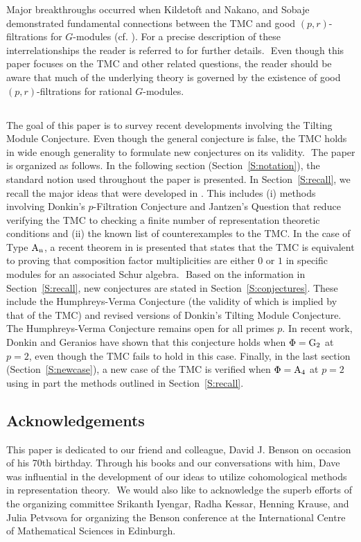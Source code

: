 \documentclass[twoside,11pt,reqno]{amsart}
\newcommand{\0}{\bar 0}
\newcommand{\1}{\bar 1}
\theoremstyle{definition}
\numberwithin{equation}{subsection}
\begin{document}
Major breakthroughs occurred when 
Kildetoft and Nakano, and Sobaje demonstrated fundamental connections between the TMC and good $(p,r)$-filtrations for $G$-modules (cf. \cite{KN15, So18}). 
For a precise description of these interrelationships the reader is referred to \cite[Section 2.2]{BNPS24} for further details.
﻿
Even though this paper focuses on the TMC and other related questions, the reader should be aware that much of the underlying theory is governed by the existence of good $(p,r)$-filtrations for rational $G$-modules. 
﻿
\subsection{} The goal of this paper is to survey recent developments involving the Tilting Module Conjecture. Even though the general conjecture is false, the TMC holds in wide enough generality to formulate new conjectures on its validity. 
﻿
The paper is organized as follows. In the following section (Section~\ref{S:notation}), the standard notion used throughout the paper is presented. In Section~\ref{S:recall}, we recall the major ideas that were developed in 
\cite{BNPS19, BNPS20, BNPS22a, BNPS22b, BNPS24,BNPS26}. This includes (i) methods involving Donkin's $p$-Filtration Conjecture and Jantzen's Question that reduce verifying the TMC to checking a finite number of representation theoretic 
conditions and (ii) the known list of counterexamples to the TMC. In the case of Type $\rm{A}_{n}$, a recent theorem in \cite{BNPS26} is presented that states that  the TMC is equivalent to proving that composition factor multiplicities are either 
$0$ or $1$ in specific modules for an associated Schur algebra. 
﻿
Based on the information in Section~\ref{S:recall}, new conjectures are stated in Section~\ref{S:conjectures}. These include the Humphreys-Verma Conjecture (the validity of which is implied by that of the TMC) and revised versions of Donkin's Tilting Module Conjecture. 
The Humphreys-Verma Conjecture remains open for all primes $p$. In recent work, Donkin and Geranios \cite{DG26} have shown that this conjecture holds when $\Phi=\rm{G}_{2}$ at $p=2$, even though the TMC fails 
to hold in this case. Finally, in the last section (Section~\ref{S:newcase}), a new case of the TMC is verified when $\Phi=\rm{A}_{4}$ at $p=2$ using in part the methods outlined in Section~\ref{S:recall}.  
﻿
﻿
\subsection{Acknowledgements} This paper is dedicated to our friend and colleague, David J. Benson on occasion of his 70th birthday. Through his books and our conversations with him, Dave was influential in the development of our ideas to utilize cohomological methods in representation theory. 
﻿
We would also like to acknowledge the superb efforts of the organizing committee Srikanth Iyengar, Radha Kessar, Henning Krause, and Julia Petvsova for organizing the Benson conference at the International Centre of Mathematical Sciences in Edinburgh. 
﻿
﻿
﻿
﻿
\end{document}
